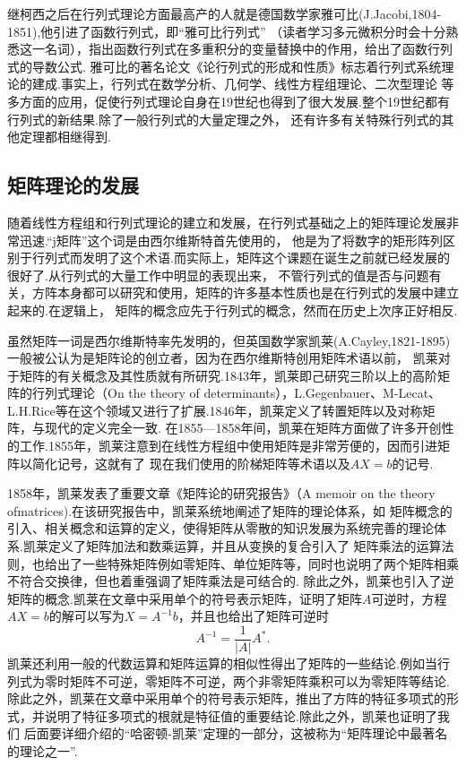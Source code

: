 继柯西之后在行列式理论方面最高产的人就是德国数学家雅可比(J.Jacobi,1804-1851),他引进了函数行列式，即``雅可比行列式''
（读者学习多元微积分时会十分熟悉这一名词），指出函数行列式在多重积分的变量替换中的作用，给出了函数行列式的导数公式.
雅可比的著名论文《论行列式的形成和性质》标志着行列式系统理论的建成.事实上，行列式在数学分析、几何学、线性方程组理论、二次型理论
等多方面的应用，促使行列式理论自身在19世纪也得到了很大发展.整个19世纪都有行列式的新结果.除了一般行列式的大量定理之外，
还有许多有关特殊行列式的其他定理都相继得到.

\subsection{矩阵理论的发展}
随着线性方程组和行列式理论的建立和发展，在行列式基础之上的矩阵理论发展非常迅速.``j矩阵''这个词是由西尔维斯特首先使用的，
他是为了将数字的矩形阵列区别于行列式而发明了这个术语.而实际上，矩阵这个课题在诞生之前就已经发展的很好了.从行列式的大量工作中明显的表现出来，
不管行列式的值是否与问题有关，方阵本身都可以研究和使用，矩阵的许多基本性质也是在行列式的发展中建立起来的.在逻辑上，
矩阵的概念应先于行列式的概念，然而在历史上次序正好相反.

虽然矩阵一词是西尔维斯特率先发明的，但英国数学家凯莱(A.Cayley,1821-1895)一般被公认为是矩阵论的创立者，因为在西尔维斯特创用矩阵术语以前，
凯莱对于矩阵的有关概念及其性质就有所研究.1843年，凯莱即己研究三阶以上的高阶矩阵的行列式理论（On the theory of
determinants），L.Gegenbauer、M-Lecat、L.H.Rice等在这个领域又进行了扩展.1846年，凯莱定义了转置矩阵以及对称矩阵，与现代的定义完全一致.
在1855—1858年间，凯莱在矩阵方面做了许多开创性的工作.1855年，凯莱注意到在线性方程组中使用矩阵是非常芳便的，因而引进矩阵以简化记号，这就有了
现在我们使用的阶梯矩阵等术语以及$AX=b$的记号.

1858年，凯莱发表了重要文章《矩阵论的研究报告》（A memoir on the theory ofmatrices).在该研究报告中，凯莱系统地阐述了矩阵的理论体系，如
矩阵概念的引入、相关概念和运算的定义，使得矩阵从零散的知识发展为系统完善的理论体系.凯莱定义了矩阵加法和数乘运算，并且从变换的复合引入了
矩阵乘法的运算法则，也给出了一些特殊矩阵例如零矩阵、单位矩阵等，同时也说明了两个矩阵相乘不符合交换律，但也着重强调了矩阵乘法是可结合的.
除此之外，凯莱也引入了逆矩阵的概念.凯莱在文章中采用单个的符号表示矩阵，证明了矩阵$A$可逆时，方程$AX=b$的解可以写为$X=A^{-1}b$，并且也给出了矩阵可逆时
\[A^{-1}=\frac{1}{|A|}A^*.\]
凯莱还利用一般的代数运算和矩阵运算的相似性得出了矩阵的一些结论.例如当行列式为零时矩阵不可逆，零矩阵不可逆，两个非零矩阵乘积可以为零矩阵等结论.
除此之外，凯莱在文章中采用单个的符号表示矩阵，推出了方阵的特征多项式的形式，并说明了特征多项式的根就是特征值的重要结论.除此之外，凯莱也证明了我们
后面要详细介绍的``哈密顿-凯莱''定理的一部分，这被称为``矩阵理论中最著名的理论之一''.

